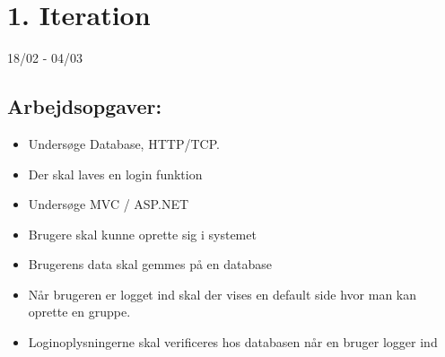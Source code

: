 \section{1. Iteration}
18/02 - 04/03

\subsection{Arbejdsopgaver:}
\begin{itemize}
    \item Undersøge Database, HTTP/TCP. 
    \item Der skal laves en login funktion
    \item Undersøge MVC / ASP.NET
    \item Brugere skal kunne oprette sig i systemet 
    \item Brugerens data skal gemmes på en database
    \item Når brugeren er logget ind skal der vises en default side hvor man kan oprette en gruppe.
    \item Loginoplysningerne skal verificeres hos databasen når en bruger logger ind

\end{itemize}



